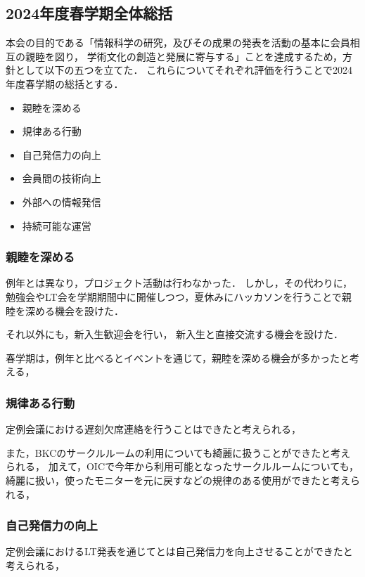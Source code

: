 \subsection*{2024年度春学期全体総括}


本会の目的である「情報科学の研究，及びその成果の発表を活動の基本に会員相互の親睦を図り，
学術文化の創造と発展に寄与する」ことを達成するため，方針として以下の五つを立てた．
これらについてそれぞれ評価を行うことで2024年度春学期の総括とする．

\begin{itemize}
    \item 親睦を深める
    \item 規律ある行動
    \item 自己発信力の向上
    \item 会員間の技術向上
    \item 外部への情報発信
    \item 持続可能な運営
  \end{itemize}


\subsubsection*{親睦を深める}
例年とは異なり，プロジェクト活動は行わなかった．
しかし，その代わりに，勉強会やLT会を学期期間中に開催しつつ，夏休みにハッカソンを行うことで親睦を深める機会を設けた．

それ以外にも，新入生歓迎会を行い， 新入生と直接交流する機会を設けた．

春学期は，例年と比べるとイベントを通じて，親睦を深める機会が多かったと考える，

\subsubsection*{規律ある行動}
定例会議における遅刻欠席連絡を行うことはできたと考えられる，

また，BKCのサークルルームの利用についても綺麗に扱うことができたと考えられる，
加えて，OICで今年から利用可能となったサークルルームについても，綺麗に扱い，使ったモニターを元に戻すなどの規律のある使用ができたと考えられる，

\subsubsection*{自己発信力の向上}
定例会議におけるLT発表を通じて\secondGrade{}と\thirdGrade{}は自己発信力を向上させることができたと考えられる，

